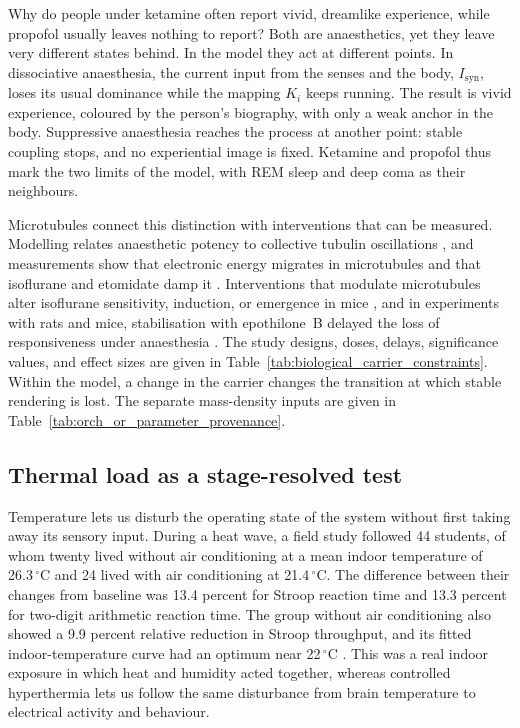 Why do people under ketamine often report vivid, dreamlike experience, while propofol
usually leaves nothing to report? Both are anaesthetics, yet they leave very different
states behind. In the model they act at different points. In dissociative
anaesthesia, the current input from the senses and the body, $I_{\mathrm{syn}}$, loses
its usual dominance while the mapping $K_i$ keeps running. The result is vivid
experience, coloured by the person's biography, with only a weak anchor in the body.
Suppressive anaesthesia reaches the process at another point: stable coupling stops,
and no experiential image is fixed. Ketamine and propofol thus mark the two limits of
the model, with REM sleep and deep coma as their neighbours.

Microtubules connect this distinction with interventions that can be measured.
Modelling relates anaesthetic potency to collective tubulin oscillations
\citep{craddock2017}, and measurements show that electronic energy migrates in
microtubules and that isoflurane and etomidate damp it \citep{kalra2023}.
Interventions that modulate microtubules alter isoflurane sensitivity, induction, or
emergence in mice \citep{li2025}, and in experiments with rats and mice,
stabilisation with epothilone~B delayed the loss of responsiveness under anaesthesia
\citep{khan2024,huang2026}. The study designs, doses, delays, significance values,
and effect sizes are given in Table~\ref{tab:biological_carrier_constraints}. Within
the model, a change in the carrier changes the transition at which stable rendering
is lost. The separate mass-density inputs are given in
Table~\ref{tab:orch_or_parameter_provenance}.

\subsection{Thermal load as a stage-resolved test}

Temperature lets us disturb the operating state of the system without first taking
away its sensory input. During a heat wave, a field study followed 44 students, of
whom twenty lived without air conditioning at a mean indoor temperature of
26.3\,${}^{\circ}$C and 24 lived with air conditioning at 21.4\,${}^{\circ}$C. The
difference between their changes from baseline was 13.4 percent for Stroop reaction
time and 13.3 percent for two-digit arithmetic reaction time. The group without air
conditioning also showed a 9.9 percent relative reduction in Stroop throughput, and
its fitted indoor-temperature curve had an optimum near 22\,${}^{\circ}$C
\citep{cedenolaurent2018}. This was a real indoor exposure in which heat and humidity
acted together, whereas controlled hyperthermia lets us follow the same disturbance
from brain temperature to electrical activity and behaviour.

